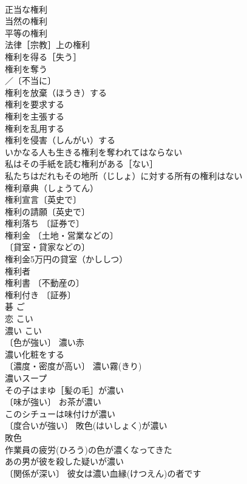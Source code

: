 \documentclass[8pt]{extreport}
\begin{document}
\begin{CJK}{UTF8}{min}
\\	正当な権利 
\\	当然の権利 
\\	平等の権利 
\\	法律［宗教］上の権利 
\\	権利を得る［失う］ 
\\	権利を奪う 
\\	／〔不当に〕
\\	権利を放棄（ほうき）する 
\\	権利を要求する 
\\	権利を主張する 
\\	権利を乱用する 
\\	権利を侵害（しんがい）する 
\\	いかなる人も生きる権利を奪われてはならない 
\\	私はその手紙を読む権利がある［ない］ 
\\	私たちはだれもその地所（じしょ）に対する所有の権利はない 
\\	権利章典（しょうてん） 
\\	権利宣言〔英史で〕 
\\	権利の請願〔英史で〕 
\\	権利落ち 〔証券で〕
\\	権利金 〔土地・営業などの〕
\\	〔貸室・貸家などの〕
\\	権利金5万円の貸室（かししつ） 
\\	権利者 
\\	権利書 〔不動産の〕
\\	権利付き 〔証券〕
\\	碁	ご	
\\	恋	こい	
\\	濃い	こい	
\\	〔色が強い〕 濃い赤 
\\	濃い化粧をする 
\\	〔濃度・密度が高い〕 濃い霧(きり) 
\\	濃いスープ 
\\	その子はまゆ［髪の毛］が濃い 
\\	〔味が強い〕 お茶が濃い 
\\	このシチューは味付けが濃い 
\\	〔度合いが強い〕 敗色(はいしょく)が濃い 
\\	敗色 
\\	作業員の疲労(ひろう)の色が濃くなってきた 
\\	あの男が彼を殺した疑いが濃い 
\\	〔関係が深い〕 彼女は濃い血縁(けつえん)の者です 

\end{CJK}
\end{document}
